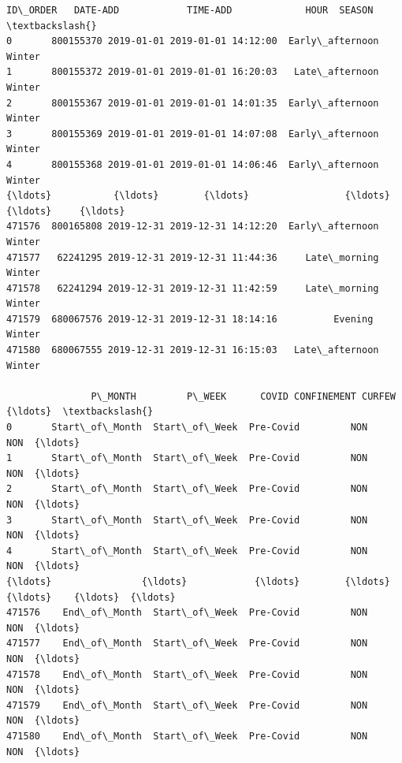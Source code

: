 \documentclass[11pt]{article}
\makeatletter
\newcommand{\boxspacing}{\kern\kvtcb@left@rule\kern\kvtcb@boxsep}
\newcommand{\prompt}[4]{
        \ttfamily\llap{{\color{#2}[#3]:\hspace{3pt}#4}}\vspace{-\baselineskip}
    }
\makeatother
\begin{document}
            \begin{tcolorbox}[breakable, size=fbox, boxrule=.5pt, pad at break*=1mm, opacityfill=0]
\prompt{Out}{outcolor}{95}{\boxspacing}
\begin{Verbatim}[commandchars=\\\{\}]
         ID\_ORDER   DATE-ADD            TIME-ADD             HOUR  SEASON  \textbackslash{}
0       800155370 2019-01-01 2019-01-01 14:12:00  Early\_afternoon  Winter
1       800155372 2019-01-01 2019-01-01 16:20:03   Late\_afternoon  Winter
2       800155367 2019-01-01 2019-01-01 14:01:35  Early\_afternoon  Winter
3       800155369 2019-01-01 2019-01-01 14:07:08  Early\_afternoon  Winter
4       800155368 2019-01-01 2019-01-01 14:06:46  Early\_afternoon  Winter
{\ldots}           {\ldots}        {\ldots}                 {\ldots}              {\ldots}     {\ldots}
471576  800165808 2019-12-31 2019-12-31 14:12:20  Early\_afternoon  Winter
471577   62241295 2019-12-31 2019-12-31 11:44:36     Late\_morning  Winter
471578   62241294 2019-12-31 2019-12-31 11:42:59     Late\_morning  Winter
471579  680067576 2019-12-31 2019-12-31 18:14:16          Evening  Winter
471580  680067555 2019-12-31 2019-12-31 16:15:03   Late\_afternoon  Winter

               P\_MONTH         P\_WEEK      COVID CONFINEMENT CURFEW  {\ldots}  \textbackslash{}
0       Start\_of\_Month  Start\_of\_Week  Pre-Covid         NON    NON  {\ldots}
1       Start\_of\_Month  Start\_of\_Week  Pre-Covid         NON    NON  {\ldots}
2       Start\_of\_Month  Start\_of\_Week  Pre-Covid         NON    NON  {\ldots}
3       Start\_of\_Month  Start\_of\_Week  Pre-Covid         NON    NON  {\ldots}
4       Start\_of\_Month  Start\_of\_Week  Pre-Covid         NON    NON  {\ldots}
{\ldots}                {\ldots}            {\ldots}        {\ldots}         {\ldots}    {\ldots}  {\ldots}
471576    End\_of\_Month  Start\_of\_Week  Pre-Covid         NON    NON  {\ldots}
471577    End\_of\_Month  Start\_of\_Week  Pre-Covid         NON    NON  {\ldots}
471578    End\_of\_Month  Start\_of\_Week  Pre-Covid         NON    NON  {\ldots}
471579    End\_of\_Month  Start\_of\_Week  Pre-Covid         NON    NON  {\ldots}
471580    End\_of\_Month  Start\_of\_Week  Pre-Covid         NON    NON  {\ldots}


\end{Verbatim}
\end{tcolorbox}
\end{document}
